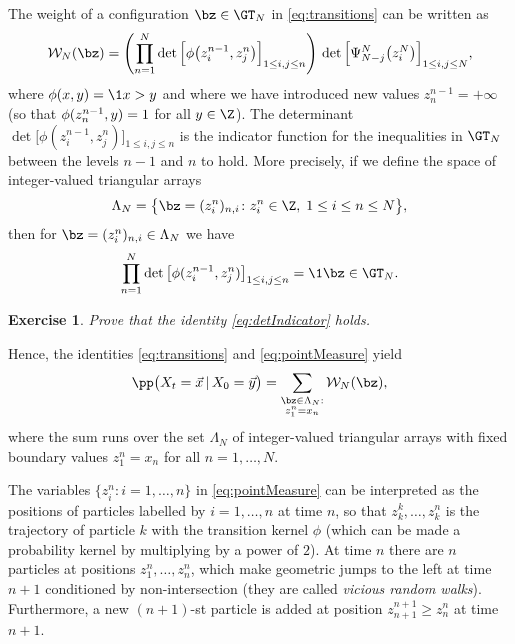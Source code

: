 \documentclass[]{pcmi}
\theoremstyle{plain}
\newtheorem{exercise}[equation]{Exercise}
\theoremstyle{definition}
\begin{document}
The weight of a configuration $\bz \in \GT_N$ in \eqref{eq:transitions} can be written as
\begin{equation}\label{eq:pointMeasure}
\mathcal{W}_N(\bz) = \left(\prod_{n=1}^N \det \Big[\phi \big(z_i^{n-1}, z_j^{n}\big)\Big]_{1\leq i,j \leq n}\right)\, \det \Big[\Psi^N_{N-j}\big(z_{i}^N\big)\Big]_{1 \leq i,j \leq N},
\end{equation}
where $\phi(x,y)=\1{x>y}$ and where we have introduced new values $z_n^{n-1}= +\infty$ (so that $\phi(z_n^{n-1},y)=\nobreak1$ for all $y \in \Z$). The determinant $\det \big[\phi(z_i^{n-1}, z_j^{n})\big]_{1\leq i,j \leq n}$ is the indicator function for the inequalities in $\GT_N$ between the levels $n-1$ and $n$ to hold. More precisely, if we define the space of integer-valued triangular arrays
\begin{equation}\label{eq:LambdaDef}
	\Lambda_N = \bigl\{\bz = (z_i^n)_{n, i} \colon z_i^n \in \Z,\; 1 \leq i \leq n \leq N \bigr\},
\end{equation}
then for $\bz = (z_i^n)_{n, i} \in \Lambda_N$ we have
\begin{equation}\label{eq:detIndicator}
\prod_{n=1}^N \det \big[\phi(z_i^{n-1}, z_j^{n})\big]_{1\leq i,j \leq n} = \1{\bz \in \GT_N}.
\end{equation}

\begin{exercise}
 Prove that the identity \eqref{eq:detIndicator} holds.
\end{exercise}

\noindent Hence, the identities \eqref{eq:transitions} and \eqref{eq:pointMeasure} yield
\begin{equation}\label{eq:prob_as_sum}
	\pp \bigl(X_t = \vec x \,|\, X_0 = \vec y\bigr) = \sum_{\substack{\bz \in \Lambda_N: \\ z_1^{n} = x_n}} \mathcal{W}_N(\bz),
\end{equation}
where the sum runs over the set $\Lambda_N$ of integer-valued triangular arrays with fixed boundary values $z_1^{n}=x_n$ for all $n = 1, \ldots, N$.

The variables \mbox{$\{z_i^n : i=1,\ldots,n\}$} in \eqref{eq:pointMeasure} can be interpreted as the positions of particles labelled by $i=1,\ldots,n$ at time $n$, so that $z_k^k,\ldots,z_k^n$ is the trajectory of particle $k$ with the transition kernel $\phi$ (which can be made a probability kernel by multiplying by a power of $2$). At time $n$ there are $n$ particles at positions $z_1^n,\ldots,z_n^n$, which make geometric jumps to the left at time $n+1$ conditioned by non-intersection (they are called \emph{vicious random walks}). Furthermore, a new $(n+1)$-st particle is added at position $z_{n+1}^{n+1} \geq z_n^n$ at time $n+1$.
\end{document}
